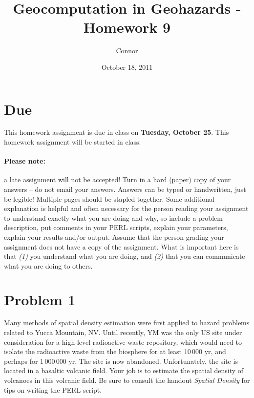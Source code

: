 \documentclass[11pt]{article}
\title{Geocomputation in Geohazards - Homework 9}
\author{Connor}
\date{October 18, 2011}
\begin{document}
 \maketitle
\section*{Due}
This homework assignment is due in class on \textbf{Tuesday, October 25}. This homework assignment will be started in class.

\paragraph{Please note:} a late assignment will not be accepted! Turn in a hard (paper) copy of your answers – do not email your answers. Answers can be typed or handwritten, just be legible! Multiple pages should be stapled together. Some additional explanation is helpful and often necessary for the person reading your assignment to understand exactly what you are doing and why, so include a problem description, put comments in your PERL scripts, explain your parameters, explain your results and/or output. Assume that the person grading your assignment does not have a copy of the assignment. What is important here is that \textit{(1)} you understand what you are doing, and\textit{ (2)} that you can communicate what you are doing to others.

\section*{Problem 1}
Many methods of spatial density estimation were first applied to hazard problems related to Yucca Mountain, NV. Until recently, YM was the only US site under consideration for a high-level radioactive waste repository, which would need to isolate the radioactive waste from the biosphere for at least 10\,000 yr, and perhaps for 1\,000\,000 yr. The site is now abandoned. Unfortunately, the site is located in a basaltic volcanic field. Your job is to estimate the spatial density of volcanoes in this volcanic field. Be sure to consult the handout {\it Spatial Density} for tips on writing the PERL script.
\end{document}
